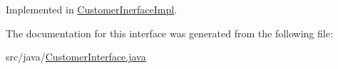 Implemented in \mbox{\hyperlink{class_customer_inerface_impl_abf7eca8202321d451365ad57abe6d6de}{Customer\+Inerface\+Impl}}.



The documentation for this interface was generated from the following file\+:\begin{DoxyCompactItemize}
\item 
src/java/\mbox{\hyperlink{_customer_interface_8java}{Customer\+Interface.\+java}}\end{DoxyCompactItemize}
